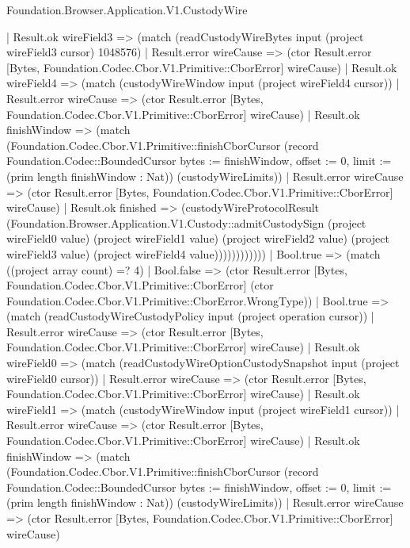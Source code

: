 \begin{lexlean}{Foundation.Browser.Application.V1.CustodyWire}
\begin{semanticmodule}
{                            | Result.ok wireField3 => (match (readCustodyWireBytes input (project wireField3 cursor) 1048576)
                              | Result.error wireCause => (ctor Result.error [Bytes, Foundation.Codec.Cbor.V1.Primitive::CborError] wireCause)
                              | Result.ok wireField4 => (match (custodyWireWindow input (project wireField4 cursor))
                                | Result.error wireCause => (ctor Result.error [Bytes, Foundation.Codec.Cbor.V1.Primitive::CborError] wireCause)
                                | Result.ok finishWindow => (match (Foundation.Codec.Cbor.V1.Primitive::finishCborCursor (record Foundation.Codec::BoundedCursor {bytes := finishWindow, offset := 0, limit := (prim length finishWindow : Nat)}) (custodyWireLimits))
                                  | Result.error wireCause => (ctor Result.error [Bytes, Foundation.Codec.Cbor.V1.Primitive::CborError] wireCause)
                                  | Result.ok finished => (custodyWireProtocolResult (Foundation.Browser.Application.V1.Custody::admitCustodySign (project wireField0 value) (project wireField1 value) (project wireField2 value) (project wireField3 value) (project wireField4 value))))))))))))
                | Bool.true => (match ((project array count) =? 4)
                  | Bool.false => (ctor Result.error [Bytes, Foundation.Codec.Cbor.V1.Primitive::CborError] (ctor Foundation.Codec.Cbor.V1.Primitive::CborError.WrongType))
                  | Bool.true => (match (readCustodyWireCustodyPolicy input (project operation cursor))
                    | Result.error wireCause => (ctor Result.error [Bytes, Foundation.Codec.Cbor.V1.Primitive::CborError] wireCause)
                    | Result.ok wireField0 => (match (readCustodyWireOptionCustodySnapshot input (project wireField0 cursor))
                      | Result.error wireCause => (ctor Result.error [Bytes, Foundation.Codec.Cbor.V1.Primitive::CborError] wireCause)
                      | Result.ok wireField1 => (match (custodyWireWindow input (project wireField1 cursor))
                        | Result.error wireCause => (ctor Result.error [Bytes, Foundation.Codec.Cbor.V1.Primitive::CborError] wireCause)
                        | Result.ok finishWindow => (match (Foundation.Codec.Cbor.V1.Primitive::finishCborCursor (record Foundation.Codec::BoundedCursor {bytes := finishWindow, offset := 0, limit := (prim length finishWindow : Nat)}) (custodyWireLimits))
                          | Result.error wireCause => (ctor Result.error [Bytes, Foundation.Codec.Cbor.V1.Primitive::CborError] wireCause)
}
\end{semanticmodule}
\end{lexlean}
